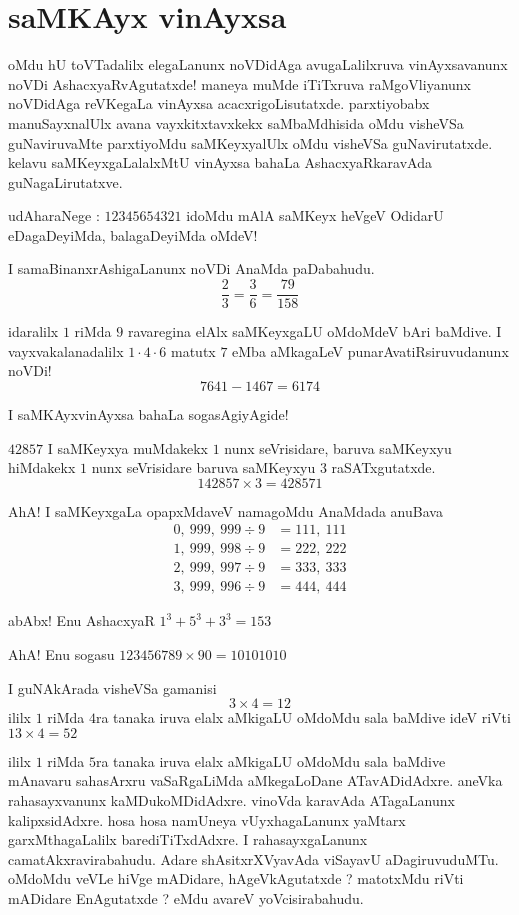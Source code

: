 \chapter{saMKAyx vinAyxsa}

oMdu hU toVTadalilx elegaLanunx noVDidAga avugaLalilxruva vinAyxsavanunx noVDi AshacxyaRvAgutatxde! maneya muMde iTiTxruva raMgoVliyanunx noVDidAga reVKegaLa vinAyxsa acacxrigoLisutatxde. parxtiyobabx manuSayxnalUlx avana vayxkitxtavxkekx saMbaMdhisida oMdu visheVSa guNaviruvaMte parxtiyoMdu saMKeyxyalUlx oMdu visheVSa guNavirutatxde. kelavu saMKeyxgaLalalxMtU vinAyxsa bahaLa AshacxyaRkaravAda guNagaLirutatxve. 

udAharaNege : $12345654321$ idoMdu mAlA saMKeyx heVgeV OdidarU eDagaDeyiMda, balagaDeyiMda oMdeV!

I samaBinanxrAshigaLanunx noVDi AnaMda paDabahudu.
$$
\frac{2}{3} = \frac{3}{6} = \frac{79}{158}
$$

idaralilx $1$ riMda $9$ ravaregina elAlx saMKeyxgaLU oMdoMdeV bAri baMdive. I vayxvakalanadalilx $1 \cdot 4 \cdot 6$ matutx $7$ eMba aMkagaLeV punarAvatiRsiruvudanunx noVDi!
$$
7641-1467 = 6174
$$

I saMKAyxvinAyxsa bahaLa sogasAgiyAgide!

$42857$ I saMKeyxya muMdakekx $1$ nunx seVrisidare, baruva saMKeyxyu hiMdakekx $1$ nunx seVrisidare baruva saMKeyxyu $3$ raSATxgutatxde.
$$
142857 \times 3 = 428571
$$

AhA! I saMKeyxgaLa opapxMdaveV namagoMdu AnaMdada anuBava
\begin{align*}
0, ~ 999, ~999 \div 9 & =111, ~111\\
1, ~999,~998 \div 9& =222, ~222\\
2,~999,~997 \div 9 &=333, ~ 333\\
3,~999, ~996 \div 9&=444, ~444
\end{align*}

abAbx! Enu AshacxyaR $1^3 + 5^3 + 3^3 = 153$

AhA! Enu sogasu $123456789 \times 90=10101010$

I guNAkArada visheVSa gamanisi
$$
3 \times 4 = 12
$$
ililx $1$ riMda $4$ra tanaka iruva elalx aMkigaLU oMdoMdu sala baMdive ideV riVti $13 \times 4 = 52$

ililx $1$ riMda $5$ra tanaka iruva elalx aMkigaLU oMdoMdu sala baMdive mAnavaru sahasArxru vaSaRgaLiMda aMkegaLoDane ATavADidAdxre. aneVka rahasayxvanunx kaMDukoMDidAdxre. vinoVda karavAda ATagaLanunx kalipxsidAdxre. hosa hosa namUneya vUyxhagaLanunx yaMtarx garxMthagaLalilx barediTiTxdAdxre. I rahasayxgaLanunx camatAkxravirabahudu.  Adare shAsitxrXVyavAda viSayavU aDagiruvuduMTu. oMdoMdu veVLe hiVge mADidare, hAgeVkAgutatxde ? matotxMdu riVti mADidare EnAgutatxde ? eMdu avareV yoVcisirabahudu.

